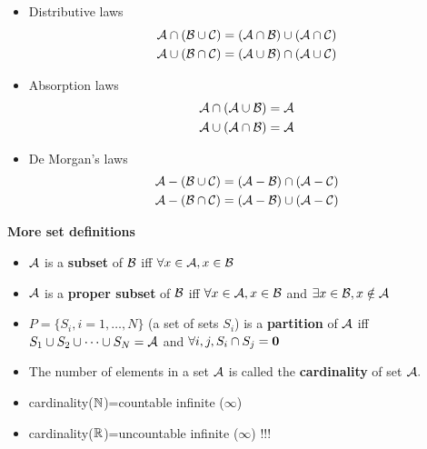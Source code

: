 \documentclass[justified,sixbynine]{tufte-book}
\def\subsubsection#1{{\bf #1}}
\theoremstyle{plain}%
\theoremstyle{definition}
\theoremstyle{remark}
\begin{document}
\begin{fullwidth}
\begin{itemize}
\item  Distributive laws
\begin{align}
{\cal A}\cap ({\cal B}\cup {\cal C}) &= ({\cal A}\cap {\cal B})\cup ({\cal A}%
\cap {\cal C}) \\
{\cal A}\cup ({\cal B}\cap {\cal C}) &= ({\cal A}\cup {\cal B})\cap ({\cal A}%
\cup {\cal C})
\end{align}

\item  Absorption laws
\begin{align}
{\cal A}\cap ({\cal A}\cup {\cal B}) &= {\cal A} \\
{\cal A}\cup ({\cal A}\cap {\cal B}) &= {\cal A}
\end{align}

\item  De Morgan's laws
\begin{align}
{\cal A}-({\cal B}\cup {\cal C}) &= ({\cal A}-{\cal B})\cap ({\cal A}-{\cal C%
}) \\
{\cal A}-({\cal B}\cap {\cal C}) &= ({\cal A}-{\cal B})\cup ({\cal A}-{\cal C%
})
\end{align}
\end{itemize}

\subsubsection{More set definitions}

\begin{itemize}
\item  ${\cal A}$ is a {\bf subset} of ${\cal B}$ iff $\forall x\in {\cal A}%
,x\in {\cal B}$

\item  ${\cal A}$ is a {\bf proper subset} of ${\cal B}$ iff $\forall x\in
{\cal A},x\in {\cal B}$ and $\exists x\in {\cal B},x\notin {\cal A}$

\item  $P=\{S_i,i=1,\dots,N\}$ (a set of sets $S_i$) is a {\bf partition} of $%
{\cal A}$ iff $S_1\cup S_2\cup \dots\cup S_N={\cal A}$ and $\forall
i,j,S_i\cap S_j={\bf 0}$

\item  The number of elements in a set ${\cal A}$ is called the {\bf %
cardinality} of set ${\cal A}.$

\item  cardinality(${\Bbb N}$)=countable infinite ($\infty $)

\item  cardinality(${\Bbb R}$)=uncountable infinite ($\infty $) !!!
\end{itemize}



\end{fullwidth}
\end{document}
